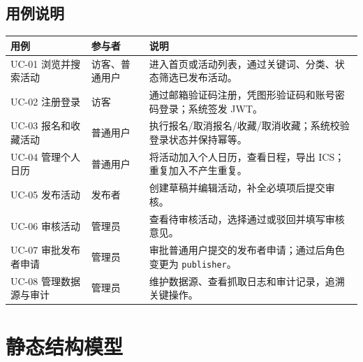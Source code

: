 \documentclass[12pt,a4paper]{ctexart}
\begin{document}
\subsection{用例说明}
\noindent\begin{tabularx}{\textwidth}{p{2.8cm}p{3.5cm}Y}
\toprule 用例 & 参与者 & 说明 \\\midrule
UC-01 浏览并搜索活动 & 访客、普通用户 & 进入首页或活动列表，通过关键词、分类、状态筛选已发布活动。 \\
UC-02 注册登录 & 访客 & 通过邮箱验证码注册，凭图形验证码和账号密码登录；系统签发 JWT。 \\
UC-03 报名和收藏活动 & 普通用户 & 执行报名/取消报名/收藏/取消收藏；系统校验登录状态并保持幂等。 \\
UC-04 管理个人日历 & 普通用户 & 将活动加入个人日历，查看日程，导出 ICS；重复加入不产生重复。 \\
UC-05 发布活动 & 发布者 & 创建草稿并编辑活动，补全必填项后提交审核。 \\
UC-06 审核活动 & 管理员 & 查看待审核活动，选择通过或驳回并填写审核意见。 \\
UC-07 审批发布者申请 & 管理员 & 审批普通用户提交的发布者申请；通过后角色变更为 \texttt{publisher}。 \\
UC-08 管理数据源与审计 & 管理员 & 维护数据源、查看抓取日志和审计记录，追溯关键操作。 \\
\bottomrule
\end{tabularx}

\section{静态结构模型}
\end{document}
